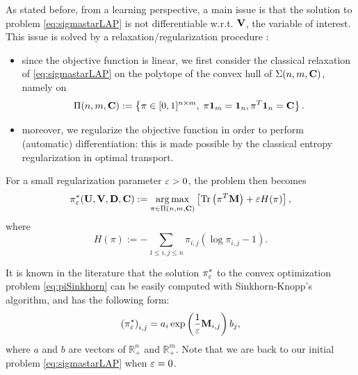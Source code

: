 As stated before, from a learning perspective, a main issue is that the solution to problem \eqref{eq:sigmastarLAP} is not differentiable w.r.t. $\mathbf{V}$, the variable of interest. This issue is solved by a relaxation/regularization procedure \cite{cuturi_sinkhorn_2013}:
\begin{itemize}
    \item since the objective function is linear, we first consider the classical relaxation of \eqref{eq:sigmastarLAP} on the polytope of the convex hull of $\Sigma(n,m,\mathbf{C})$, namely on
    \begin{equation*}\label{eq:defPi}
    \Pi(n,m,\mathbf{C}) := \left\lbrace \pi \in [0,1]^{n \times m}, \; {\pi \mathbf{1}_m}  = { \mathbf{1}_n}, {\pi^T \mathbf{1}_n} = \mathbf{C} \right\rbrace.
    \end{equation*}
    \item moreover, we regularize the objective function in order to perform (automatic) differentiation: this is made possible by the classical entropy regularization in optimal transport.
\end{itemize}
For a small regularization parameter $\varepsilon>0$, the problem then becomes
\begin{equation}\label{eq:piSinkhorn}
    \pi_{\varepsilon}^*(\mathbf{U},\mathbf{V},\mathbf{D},\mathbf{C}) := \operatorname*{arg\,max}_{\pi \in \Pi(n,m,\mathbf{C})} \left[{\rm Tr}\left( \pi^T \mathbf{M} \right) + \varepsilon H(\pi) \right],
\end{equation} where
\begin{equation}\label{eq:Hpi}
    H(\pi) := - \sum_{1 \leq i,j \leq n} \pi_{i,j} (\log \pi_{i,j}-1).
\end{equation}

It is known in the literature \cite{cuturi_sinkhorn_2013} that the solution $\pi_{\varepsilon}^*$ to the convex optimization problem \eqref{eq:piSinkhorn} can be easily computed with Sinkhorn-Knopp's algorithm, and has the following form:
\begin{equation}\label{eq:formesinkhorn}
    \left(\pi_{\varepsilon}^* \right)_{i,j} = a_i \exp\left( \frac{1}{\varepsilon} \mathbf{M}_{i,j} \right) b_j,
\end{equation} where $a$ and $b$ are vectors of $\mathbb{R}_+^n$ and $\mathbb{R}_+^m$.
Note that we are back to our initial problem \eqref{eq:sigmastarLAP} when $\varepsilon=0$.

